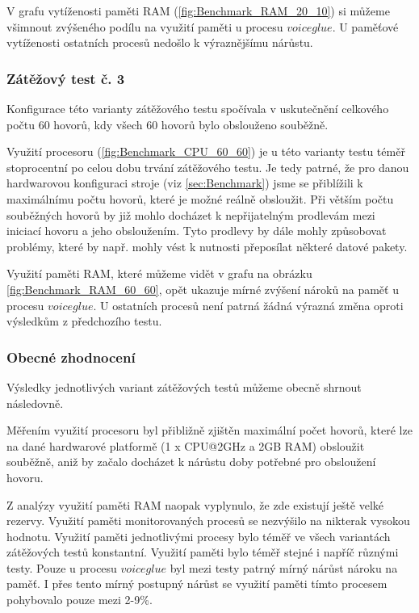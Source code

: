\documentclass[ing,male,java,dept460,twoside]{diploma}						%
\begin{document}
V grafu vytíženosti paměti RAM (\ref{fig:Benchmark_RAM_20_10}) si můžeme všimnout zvýšeného podílu na využití paměti u procesu $voiceglue$. U paměťové vytíženosti ostatních procesů nedošlo k výraznějšímu nárůstu.

\subsubsection{Zátěžový test č. 3}
Konfigurace této varianty zátěžového testu spočívala v uskutečnění celkového počtu 60 hovorů, kdy všech 60 hovorů bylo obslouženo souběžně.

Využití procesoru (\ref{fig:Benchmark_CPU_60_60}) je u této varianty testu téměř stoprocentní po celou dobu trvání zátěžového testu. Je tedy patrné, že pro danou hardwarovou konfiguraci stroje (viz \ref{sec:Benchmark}) jsme se přiblížili k maximálnímu počtu hovorů, které je možné reálně obsloužit. Při větším počtu souběžných hovorů by již mohlo docházet k nepřijatelným prodlevám mezi iniciací hovoru a jeho obsloužením. Tyto prodlevy by dále mohly způsobovat problémy, které by např. mohly vést k nutnosti přeposílat některé datové pakety.

Využití paměti RAM, které můžeme vidět v grafu na obrázku \ref{fig:Benchmark_RAM_60_60}, opět ukazuje mírné zvýšení nároků na paměť u procesu $voiceglue$. U ostatních procesů není patrná žádná výrazná změna oproti výsledkům z předchozího testu.


\subsubsection{Obecné zhodnocení}
Výsledky jednotlivých variant zátěžových testů můžeme obecně shrnout následovně.

Měřením využití procesoru byl přibližně zjištěn maximální počet hovorů, které lze na dané hardwarové platformě (1 x CPU@2GHz a 2GB RAM) obsloužit souběžně, aniž by začalo docházet k nárůstu doby potřebné pro obsloužení hovoru.

Z analýzy využití paměti RAM naopak vyplynulo, že zde existují ještě velké rezervy. Využití paměti monitorovaných procesů se nezvýšilo na nikterak vysokou hodnotu. Využití paměti jednotlivými procesy bylo téměř ve všech variantách zátěžových testů konstantní. Využití paměti bylo téměř stejné i napříč různými testy. Pouze u procesu $voiceglue$ byl mezi testy patrný mírný nárůst nároku na paměť. I přes tento mírný postupný nárůst se využití paměti tímto procesem pohybovalo pouze mezi 2-9\%.
\end{document}
